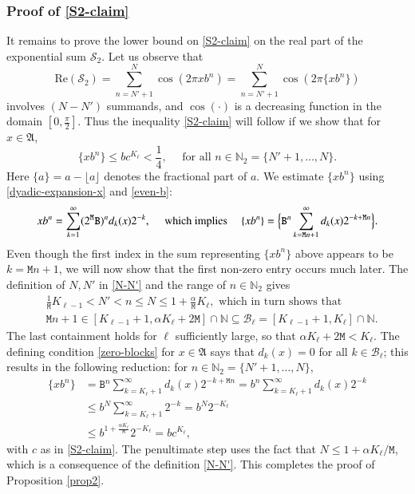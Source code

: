 \documentclass[12pt, twoside]{article}
\theoremstyle{definition}
\numberwithin{equation}{section}
\begin{document}
\subsubsection{Proof of \eqref{S2-claim}} \label{S2-claim-section}  
It remains to prove the lower bound on \eqref{S2-claim} on the real part of the exponential sum $\mathcal S_2$. Let us observe that
\[ \text{Re}(\mathcal S_2) = \sum_{n=N'+1}^{N} \cos(2 \pi xb^n) = \sum_{n=N'+1}^{N} \cos(2 \pi \{ xb^n \}) \]
involves $(N-N')$ summands, and $\cos( \cdot)$ is a decreasing function in the domain $[0, \frac{\pi}{2}]$. Thus the inequality \eqref{S2-claim} will follow if we show that for $x \in \mathfrak A$, 
\begin{equation} 
\{xb^n\} \leq b c^{K_{\ell}} < \frac{1}{4}, \quad \text{ for all } n \in \mathbb N_2 = \{N'+1, \ldots, N\}.  
\end{equation} 
Here $\{a\} = a - \lfloor a \rfloor$ denotes the fractional part of $a$. 
\vskip0.1in 
\noindent We estimate $\{xb^n\}$ using \eqref{dyadic-expansion-x} and \eqref{even-b}:
\[ xb^n= \sum_{k=1}^{\infty} (2^{\mathtt M} \mathtt B)^n d_k(x) 2^{-k}, \quad \text{ which implies } \quad  \{xb^n\}= \Bigl\{ \mathtt B^n \sum_{k=\mathtt Mn+1}^{\infty} d_k(x) 2^{-k + \mathtt Mn} \Bigr\}.  \] 
Even though the first index in the sum representing $\{xb^n\}$ above appears to be $k = \mathtt Mn+1$, we will now show that the first non-zero entry occurs much later. The definition of $N, N'$ in \eqref{N-N'} and the range of $n \in \mathbb N_2$ gives 
\begin{align*}  
&\frac{1}{\mathtt M} K_{\ell-1} < N'  < n \leq N \leq 1 + \frac{\alpha}{\mathtt M} K_{\ell}, \text{ which in turn shows that } \\ 
&\mathtt Mn + 1 \in [K_{\ell-1} + 1, \alpha K_{\ell} + 2\mathtt M] \cap \mathbb N \subseteq \mathcal B_{\ell} = [K_{\ell-1}+1, K_{\ell}] \cap \mathbb N.  
\end{align*} 
The last containment holds for $\ell$ sufficiently large, so that $\alpha K_{\ell} + 2 \mathtt M < K_{\ell}$. The defining condition \eqref{zero-blocks} for $x \in \mathfrak A$ says that $d_k(x) = 0$ for all $k \in \mathcal B_{\ell}$; this results in the following reduction: for $n \in \mathbb N_2 = \{N' + 1, \ldots, N\}$, 
\begin{align*} 
\{xb^n\} &= \mathtt B^n \sum_{k = K_{\ell} + 1}^{\infty} d_k(x) 2^{-k + \mathtt Mn} = b^n \sum_{k = K_{\ell} + 1}^{\infty} d_k(x) 2^{-k} \\ 
&\leq b^{N} \sum_{k = K_{\ell} + 1}^{\infty} 2^{-k} = b^N 2^{-K_{\ell}} \\ 
&\leq b^{1 + \frac{\alpha K_{\ell}}{\mathtt M}} 2^{-K_{\ell}}  = b c^{K_{\ell}}, 
\end{align*}  
with $c$ as in \eqref{S2-claim}. The penultimate step uses the fact that $N \leq 1 + \alpha K_{\ell}/\mathtt M$, which is a consequence of the definition \eqref{N-N'}. This completes the proof of Proposition \ref{prop2}. 
\end{document}
